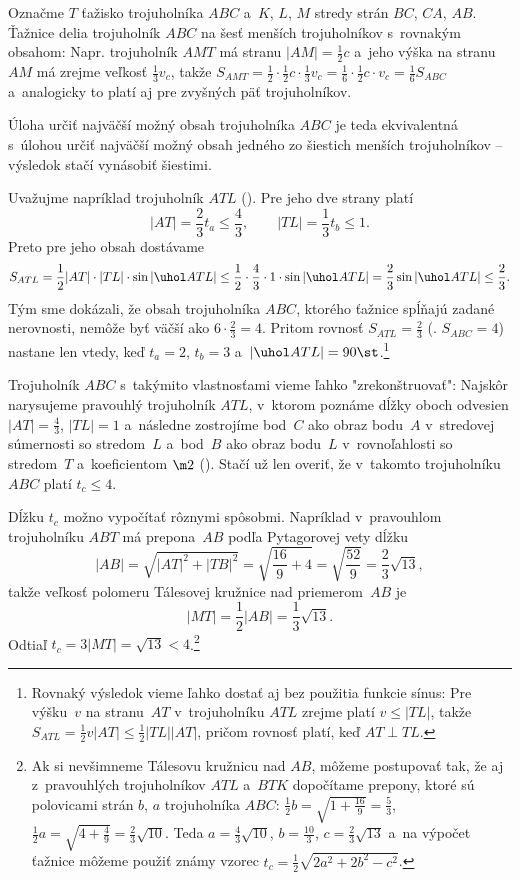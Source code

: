 {%
Označme $T$ ťažisko trojuholníka $ABC$ a~$K$, $L$, $M$ stredy strán $BC$, $CA$, $AB$. Ťažnice delia trojuholník $ABC$ na šesť menších trojuholníkov s~rovnakým obsahom: Napr. trojuholník $AMT$ má stranu $|AM|=\frac12c$ a~jeho výška na stranu~$AM$ má zrejme veľkosť $\frac13v_c$, takže $S_{AMT}=\frac12\cdot\frac12c\cdot\frac13v_c=\frac16\cdot\frac12c\cdot v_c=\frac16S_{ABC}$ a~analogicky to platí aj pre zvyšných päť trojuholníkov.

Úloha určiť najväčší možný obsah trojuholníka $ABC$ je teda ekvivalentná s~úlohou určiť najväčší možný obsah jedného zo šiestich menších trojuholníkov -- výsledok stačí vynásobiť šiestimi.
%

Uvažujme napríklad trojuholník $ATL$ (\obr). Pre jeho dve strany platí
$$
|AT|=\frac23t_a\le\frac43,\qquad |TL|=\frac13t_b\le1.
$$
Preto pre jeho obsah dostávame
$$
S_{ATL}=\frac12|AT|\cdot|TL|\cdot\sin|\uhol ATL|\le\frac12\cdot\frac43\cdot1\cdot\sin|\uhol ATL|=\frac23\sin|\uhol ATL|\le\frac23.
$$
Tým sme dokázali, že obsah trojuholníka $ABC$, ktorého ťažnice spĺňajú zadané nerovnosti, nemôže byť väčší ako $6\cdot\frac23=4$. Pritom rovnosť $S_{ATL}=\frac23$ (\tj. $S_{ABC}=4$) nastane len vtedy, keď $t_a=2$, $t_b=3$ a~$|\uhol ATL|=90\st$.\footnote{Rovnaký výsledok vieme ľahko dostať aj bez použitia funkcie sínus: Pre výšku~$v$ na stranu~$AT$ v~trojuholníku $ATL$ zrejme platí $v\le|TL|$, takže $S_{ATL}=\frac12v|AT|\le\frac12|TL||AT|$, pričom rovnosť platí, keď $AT\perp TL$.}

Trojuholník $ABC$ s~takýmito vlastnosťami vieme ľahko "zrekonštruovať": Najskôr narysujeme pravouhlý trojuholník $ATL$, v~ktorom poznáme dĺžky oboch odvesien $|AT|=\frac43$, $|TL|=1$ a~následne zostrojíme bod~$C$ ako obraz bodu~$A$ v~stredovej súmernosti so stredom~$L$ a~bod~$B$ ako obraz bodu~$L$ v~rovnoľahlosti so stredom~$T$ a~koeficientom $\m2$ (\obr). Stačí už len overiť, že v~takomto trojuholníku $ABC$ platí $t_c\le4$.
%

Dĺžku $t_c$ možno vypočítať rôznymi spôsobmi. Napríklad v~pravouhlom trojuholníku $ABT$ má prepona~$AB$ podľa Pytagorovej vety dĺžku
$$
|AB|=\sqrt{|AT|^2+|TB|^2}=\sqrt{\frac{16}9+4}=\sqrt{\frac{52}9}=\frac23\sqrt{13},
$$
takže veľkosť polomeru Tálesovej kružnice nad priemerom~$AB$ je
$$
|MT|=\frac12|AB|=\frac13\sqrt{13}.
$$
Odtiaľ $t_c=3|MT|=\sqrt{13}<4$.\footnote{Ak si nevšimneme Tálesovu kružnicu nad $AB$, môžeme postupovať tak, že aj z~pravouhlých trojuholníkov $ATL$ a~$BTK$ dopočítame prepony, ktoré sú polovicami strán $b$, $a$ trojuholníka $ABC$: $\frac12b=\sqrt{1+\frac{16}9}=\frac53$, $\frac12a=\sqrt{4+\frac49}=\frac23\sqrt{10}$. Teda $a=\frac43\sqrt{10}$, $b=\frac{10}3$, $c=\frac23\sqrt{13}$ a~na výpočet ťažnice môžeme použiť známy vzorec $t_c=\frac12\sqrt{2a^2+2b^2-c^2}$.}

}
